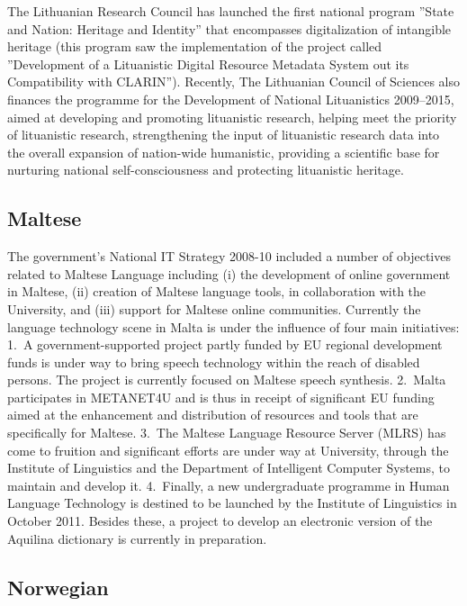 \documentclass[10pt, plain]{../../metanetpaper}
\begin{document}
\begin{multicols}{2}
The Lithuanian Research Council has launched the first national program ”State and Nation: Heritage and Identity” that encompasses digitalization of intangible heritage (this program saw the implementation of the project called ”Development of a Lituanistic Digital Resource Metadata System out its Compatibility with CLARIN”).  Recently, The Lithuanian Council of Sciences also finances the programme for the Development of National Lituanistics 2009–2015, aimed at developing and promoting lituanistic research, helping meet the priority of lituanistic research, strengthening the input of lituanistic research data into the overall expansion of nation-wide humanistic, providing a scientific base for nurturing national self-consciousness and protecting lituanistic heritage.

\subsection*{Maltese}
\label{sec:maltese}

The government’s National IT Strategy 2008-10 included a number of objectives related to Maltese Language including (i) the development of online government in Maltese, (ii) creation of Maltese language tools, in collaboration with the University, and (iii) support for Maltese online communities.  Currently the language technology scene in Malta is under the influence of four main initiatives: 1.~A government-supported project partly funded by EU regional development funds is under way to bring speech technology within the reach of disabled persons. The project is currently focused on Maltese speech synthesis.  2.~Malta participates in METANET4U and is thus in receipt of significant EU funding aimed at the enhancement and distribution of resources and tools that are specifically for Maltese.  3.~The Maltese Language Resource Server (MLRS) has come to fruition and significant efforts are under way at University, through the Institute of Linguistics and the Department of Intelligent Computer Systems, to maintain and develop it.  4.~Finally, a new undergraduate programme in Human Language Technology is destined to be launched by the Institute of Linguistics in October 2011.  Besides these, a project to develop an electronic version of the Aquilina dictionary is currently in preparation.

\subsection*{Norwegian}
\label{sec:norwegian}


\end{multicols}
\end{document}

